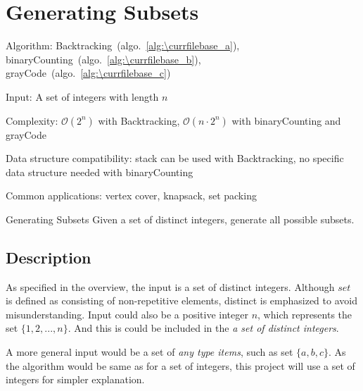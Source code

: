 \documentclass[catalog.tex]{subfiles}
\begin{document}
\def\pbname{Generating Subsets} %

\section{\pbname} 

\begin{overview}
\item [Algorithm:] Backtracking~(algo.~\ref{alg:\currfilebase_a}), binaryCounting~(algo.~\ref{alg:\currfilebase_b}), grayCode~(algo.~\ref{alg:\currfilebase_c})
\item [Input:] A set of integers with length $n$
\item [Complexity:] $\mathcal{O}(2^n)$ with Backtracking, $\mathcal{O}(n\cdot 2^n)$ with binaryCounting and grayCode
\item [Data structure compatibility:] stack can be used with Backtracking, no specific data structure needed with binaryCounting 
\item [Common applications:] vertex cover, knapsack, set packing \cite{1}
\end{overview}


\begin{problem}{\pbname}
	Given a set of distinct integers, generate all possible subsets. 
\end{problem}


\subsection*{Description}
As specified in the overview, the input is a set of distinct integers. Although $set$ is defined as consisting of non-repetitive elements, distinct is emphasized to avoid misunderstanding. Input could also be a positive integer $n$, which represents the set $\{ 1, 2, ... ,n\}$. And this is could be included in the \textit{a set of distinct integers}. 

A more general input would be a set of \textit{any type items}, such as set $\{ a, b, c\}$. As the algorithm would be same as for a set of integers, this project will use a set of integers for simpler explanation. 
\end{document}
